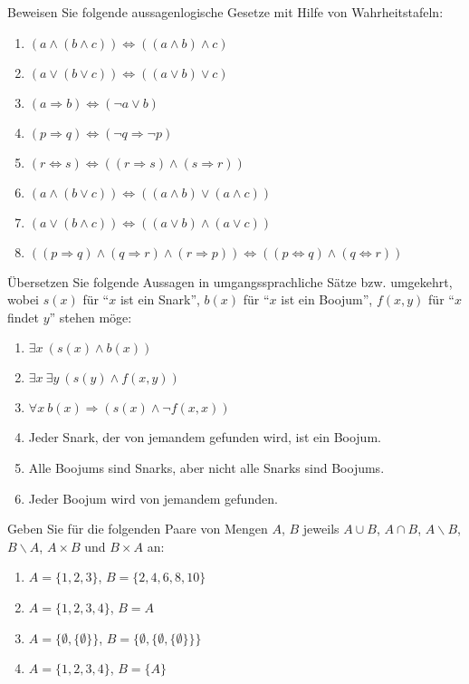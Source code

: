 
Beweisen Sie folgende aussagenlogische Gesetze mit Hilfe von Wahrheitstafeln:
\begin{enumerate}
\item $(a\wedge(b\wedge c))\Leftrightarrow((a\wedge b)\wedge c)$
\item $(a\vee(b\vee c))\Leftrightarrow((a\vee b)\vee c)$
\item $(a\Rightarrow b)\Leftrightarrow(\neg a\vee b)$
\item $(p\Rightarrow q)\Leftrightarrow(\neg q\Rightarrow\neg p)$
\item $(r\Leftrightarrow s)\Leftrightarrow((r\Rightarrow s)\wedge (s\Rightarrow r))$
\item $(a\wedge(b\vee c))\Leftrightarrow((a\wedge b)\vee(a\wedge c))$
\item $(a\vee(b\wedge c))\Leftrightarrow((a\vee b)\wedge(a\vee c))$
\item $((p\Rightarrow q)\wedge(q\Rightarrow r)\wedge(r\Rightarrow p))\Leftrightarrow((p\Leftrightarrow q)\wedge(q\Leftrightarrow r))$
\end{enumerate}




Übersetzen Sie folgende Aussagen in umgangssprachliche Sätze bzw. umgekehrt, wobei $s(x)$ für ``$x$ ist ein Snark'', $b(x)$ für ``$x$ ist ein Boojum'', $f(x,y)$ für ``$x$ findet $y$'' stehen möge:
\begin{enumerate}
\item $\exists x~(s(x)\wedge b(x))$
\item $\exists x~\exists y~(s(y)\wedge f(x,y))$
\item $\forall x~b(x)\Rightarrow (s(x)\wedge \neg f(x,x))$
\item Jeder Snark, der von jemandem gefunden wird, ist ein Boojum.
\item Alle Boojums sind Snarks, aber nicht alle Snarks sind Boojums.
\item Jeder Boojum wird von jemandem gefunden.
\end{enumerate}




Geben Sie für die folgenden Paare von Mengen $A$, $B$ jeweils $A\cup B$, $A\cap B$, $A\backslash B$, $B\backslash A$, $A\times B$ und $B\times A$ an:\\
\parbox{0.5\textwidth}{
\begin{enumerate}
\item $A=\{1,2,3\}$, $B=\{2,4,6,8,10\}$
\item $A=\{1,2,3,4\}$, $B=A$
\end{enumerate}}\parbox{0.5\textwidth}{
\begin{enumerate}\setcounter{enumi}{2}
\item $A=\{\emptyset,\{\emptyset\}\}$, $B=\{\emptyset,\{\emptyset,\{\emptyset\}\}\}$
\item $A=\{1,2,3,4\}$, $B=\{A\}$
\end{enumerate}}



